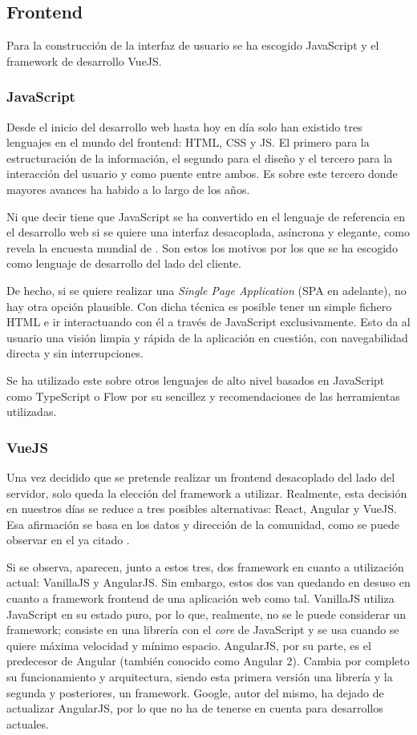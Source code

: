 \subsection{Frontend}
Para la construcción de la interfaz de usuario se ha escogido JavaScript y el framework de desarrollo VueJS.

\subsubsection{JavaScript}
Desde el inicio del desarrollo web hasta hoy en día solo han existido tres lenguajes en el mundo del frontend: HTML, CSS y JS. El primero para la estructuración de la información, el segundo para el diseño y el tercero para la interacción del usuario y como puente entre ambos. Es sobre este tercero donde mayores avances ha habido a lo largo de los años.

Ni que decir tiene que JavaScript se ha convertido en el lenguaje de referencia en el desarrollo web si se quiere una interfaz desacoplada, asíncrona y elegante, como revela la encuesta mundial de . Son estos los motivos por los que se ha escogido como lenguaje de desarrollo del lado del cliente.

De hecho, si se quiere realizar una \textit{Single Page Application} (SPA en adelante), no hay otra opción plausible. Con  dicha técnica es posible tener un simple fichero HTML e ir interactuando con él a través de JavaScript exclusivamente. Esto da al usuario una visión limpia y rápida de la aplicación en cuestión, con navegabilidad directa y sin interrupciones.

Se ha utilizado este sobre otros lenguajes de alto nivel basados en JavaScript como TypeScript o Flow por su sencillez y recomendaciones de las herramientas utilizadas.

\subsubsection{VueJS}

Una vez decidido que se pretende realizar un frontend desacoplado del lado del servidor, solo queda la elección del framework a utilizar. Realmente, esta decisión en nuestros días se reduce a tres posibles alternativas: React, Angular y VueJS. Esa afirmación se basa en los datos y dirección de la comunidad, como se puede observar en el ya citado .

Si se observa, aparecen, junto a estos tres, dos framework en cuanto a utilización actual: VanillaJS y AngularJS. Sin embargo, estos dos van quedando en desuso en cuanto a framework frontend de una aplicación web como tal. VanillaJS utiliza JavaScript en su estado puro, por lo que, realmente, no se le puede considerar un framework; consiste en una librería con el \textit{core} de JavaScript y se usa cuando se quiere máxima velocidad y mínimo espacio. AngularJS, por su parte, es el predecesor de Angular (también conocido como Angular 2). Cambia por completo su funcionamiento y arquitectura, siendo esta primera versión una librería y la segunda y posteriores, un framework. Google, autor del mismo, ha dejado de actualizar AngularJS, por lo que no ha de tenerse en cuenta para desarrollos actuales.

